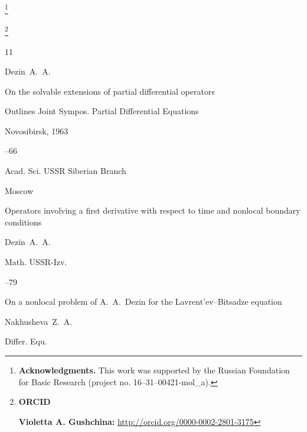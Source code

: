 \thanks{{\bf Acknowledgments.} This work was supported by the Russian Foundation for Basic Research (project no. 16--31--00421-mol\_a).}



\thanks{{\bf ORCID}



{\bf Violetta A. Gushchina:} \url{http://orcid.org/0000-0002-2801-3175}



}



\EngRef



\begin{thebibliography}{11}




\by Dezin~A.~A.

\paper On the solvable extensions of partial differential operators


\inbook Outlines Joint Sympos. Partial Differential Equations 

\procinfo Novosibirsk, 1963

–66 

\publ Acad. Sci. USSR Siberian Branch

\publaddr Moscow





\paper Operators involving a first derivative with respect to time and nonlocal boundary conditions

\by Dezin~A.~A.

\jour Math. USSR-Izv.




--79





\paper On a nonlocal problem of A.~A.~Dezin for the Lavrent'ev--Bitsadze equation

\by Nakhusheva~Z.~A.

\jour Differ. Equ.



\end{thebibliography}
